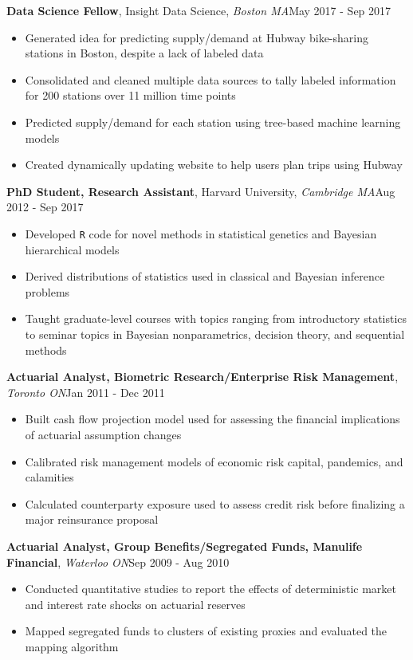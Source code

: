 \documentclass[10pt,english]{article}
\begin{document}
\textbf{Data Science Fellow}, Insight Data Science, \textit{Boston
MA}\hfill{}May 2017 - Sep 2017
\begin{itemize}
\item Generated idea for predicting supply/demand at Hubway bike-sharing
stations in Boston, despite a lack of labeled data
\item Consolidated and cleaned multiple data sources to tally labeled information
for 200 stations over 11 million time points
\item Predicted supply/demand for each station using tree-based machine
learning models
\item Created dynamically updating website to help users plan trips using
Hubway
\end{itemize}
\vspace{2.5mm}

\textbf{PhD Student, Research Assistant}, Harvard University, \textit{Cambridge
MA}\hfill{}Aug 2012 - Sep 2017
\begin{itemize}
\item Developed \texttt{R} code for novel methods in statistical genetics
and Bayesian hierarchical models
\item Derived distributions of statistics used in classical and Bayesian
inference problems
\item Taught graduate-level courses with topics ranging from introductory
statistics to seminar topics in Bayesian nonparametrics, decision
theory, and sequential methods
\end{itemize}
\vspace{2.5mm}

\textbf{Actuarial Analyst, Biometric Research/Enterprise Risk Management},
\textit{Toronto ON}\hfill{}Jan 2011 - Dec 2011
\begin{itemize}
\item Built cash flow projection model used for assessing the financial
implications of actuarial assumption changes
\item Calibrated risk management models of economic risk capital, pandemics,
and calamities
\item Calculated counterparty exposure used to assess credit risk before
finalizing a major reinsurance proposal
\end{itemize}
\vspace{2.5mm}

\textbf{Actuarial Analyst, Group Benefits/Segregated Funds, Manulife
Financial}, \textit{Waterloo ON}\hfill{}Sep 2009 - Aug 2010
\begin{itemize}
\item Conducted quantitative studies to report the effects of deterministic
market and interest rate shocks on actuarial reserves
\item Mapped segregated funds to clusters of existing proxies and evaluated
the mapping algorithm
\end{itemize}
\vspace{2.5mm}
\end{document}
